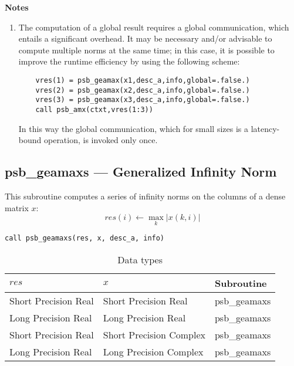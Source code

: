 {\par\noindent\large\bfseries Notes}
\begin{enumerate}
\item The computation of a global result requires a global
  communication, which entails a significant overhead. It may be
  necessary and/or advisable to compute multiple norms at the same 
  time; in this case, it is possible to improve the runtime efficiency
  by using the following scheme:
  \begin{lstlisting}
    vres(1) = psb_geamax(x1,desc_a,info,global=.false.)
    vres(2) = psb_geamax(x2,desc_a,info,global=.false.)
    vres(3) = psb_geamax(x3,desc_a,info,global=.false.)
    call psb_amx(ctxt,vres(1:3))
  \end{lstlisting}
  In this way the global communication, which for small sizes is a
  latency-bound operation, is invoked only once.
\end{enumerate}

%
%

\clearpage\subsection{psb\_geamaxs --- Generalized Infinity Norm}

This subroutine computes a series of  infinity norms on the columns of
a  dense matrix  $x$: 
\[ res(i) \leftarrow \max_k |x(k,i)| \]

\begin{verbatim}
call psb_geamaxs(res, x, desc_a, info)
\end{verbatim}

\begin{table}[h]
\begin{center}
\begin{tabular}{lll}
\hline
$res$&  $x$& {\bf Subroutine}\\
\hline
Short Precision Real    &Short Precision Real    & psb\_geamaxs\\
Long Precision Real    &Long Precision Real    & psb\_geamaxs\\
Short Precision Real &Short Precision Complex & psb\_geamaxs\\	
Long Precision Real &Long Precision Complex & psb\_geamaxs\\	
\hline
\end{tabular}
\end{center}
\caption{Data types\label{tab:f90mamax}}
\end{table}

